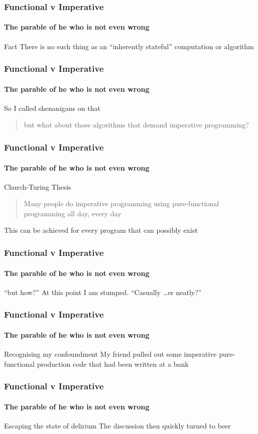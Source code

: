{\begin{frame}
\frametitle{Functional v Imperative}
\framesubtitle{The parable of he who is not even wrong}
\begin{block}{Fact}
There is no such thing as an ``inherently stateful'' computation or algorithm
\end{block}
\end{frame}


\begin{frame}
\frametitle{Functional v Imperative}
\framesubtitle{The parable of he who is not even wrong}
\begin{block}{So I called shenanigans on that}
\begin{quote}
but what about those algorithms that demand imperative programming?
\end{quote}
\end{block}
\end{frame}


\begin{frame}
\frametitle{Functional v Imperative}
\framesubtitle{The parable of he who is not even wrong}
\begin{block}{Church-Turing Thesis}
\begin{quote}
Many people do imperative programming using pure-functional programming all day, every day
\end{quote}
This can be achieved for every program that can possibly exist
\end{block}
\end{frame}


\begin{frame}
\frametitle{Functional v Imperative}
\framesubtitle{The parable of he who is not even wrong}
\begin{block}{``but how?''}
At this point I am stumped. ``Casually \ldots er neatly?''
\end{block}
\end{frame}


\begin{frame}
\frametitle{Functional v Imperative}
\framesubtitle{The parable of he who is not even wrong}
\begin{block}{Recognising my confoundment}
My friend pulled out some imperative pure-functional production code that had been written at a bank
\end{block}
\end{frame}


\begin{frame}
\frametitle{Functional v Imperative}
\framesubtitle{The parable of he who is not even wrong}
\begin{block}{Escaping the state of delirium}
The discussion then quickly turned to beer
\end{block}
\end{frame}
}


